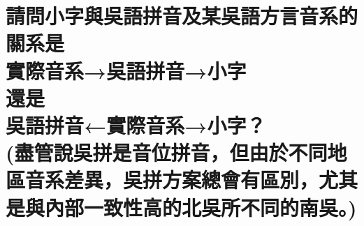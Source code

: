 %

\chapter[請問小字與吳語拼音及某吳語方言音系的關系是 實際音系→吳語拼音→小字 還是 吳語拼音←實際音系→小字？ (盡管說吳拼是音位拼音，但由於不同地區音系差異，吳拼方案總會有區別，尤其是與內部一致性高的北吳所不同的南吳。)]{請問小字與吳語拼音及某吳語方言音系的關系是 \\[0.35em] 實際音系→吳語拼音→小字 \\[0.35em] 還是 \\[0.35em] 吳語拼音←實際音系→小字？ \\[0.35em] (盡管說吳拼是音位拼音，但由於不同地區音系差異，吳拼方案總會有區別，尤其是與內部一致性高的北吳所不同的南吳。)}

